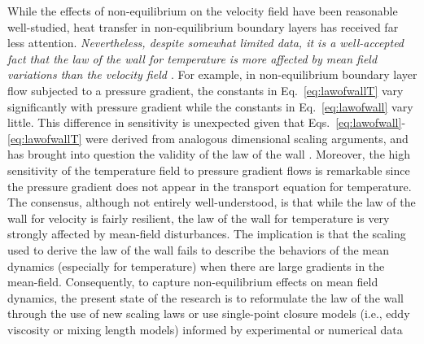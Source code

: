 While the effects of non-equilibrium on the velocity field have been reasonable well-studied, heat transfer in non-equilibrium boundary layers has received far less attention. \emph{Nevertheless, despite somewhat limited data, it is a well-accepted fact that the law of the wall for temperature is more affected by mean field variations than the velocity field \cite{Blackwell_1972, Kader1991, Bradshaw1995, Kong2001, Houra2006, Wang2008}}. For example, in non-equilibrium boundary layer flow subjected to a pressure gradient, the constants in Eq.~\ref{eq:lawofwallT} vary significantly with pressure gradient while the constants in Eq.~\ref{eq:lawofwall} vary little. This difference in sensitivity is unexpected given that Eqs.~\ref{eq:lawofwall}-\ref{eq:lawofwallT} were derived from analogous dimensional scaling arguments, and has brought into question the validity of the law of the wall \cite{Bradshaw1995}. Moreover, the high sensitivity of the temperature field to pressure gradient flows is remarkable since the pressure gradient does not appear in the transport equation for temperature. The consensus, although not entirely well-understood, is that while the law of the wall for velocity is fairly resilient, the law of the wall for temperature is very strongly affected by mean-field disturbances. The implication is that the scaling used to derive the law of the wall fails to describe the behaviors of the mean dynamics (especially for temperature) when there are large gradients in the mean-field. Consequently, to capture non-equilibrium effects on mean field dynamics, the present state of the research is to reformulate the law of the wall through the use of new scaling laws \cite{Durbin1992, George1993, Cruz1998, Cruz2002, Wang2008} or use single-point closure models (i.e., eddy viscosity or mixing length models) informed by experimental or numerical data \cite{Cebeci1988} %

